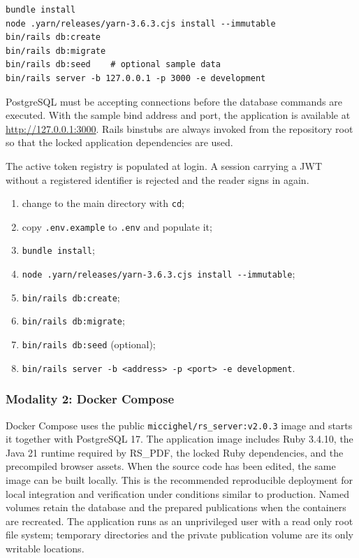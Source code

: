 \documentclass[a4paper, english]{article}
\newcounter{subsubsubsection}[subsubsection]
\newcommand{\rspdf}{RS\_PDF\xspace}
\begin{document}
\begin{lstlisting}
bundle install
node .yarn/releases/yarn-3.6.3.cjs install --immutable
bin/rails db:create
bin/rails db:migrate
bin/rails db:seed    # optional sample data
bin/rails server -b 127.0.0.1 -p 3000 -e development
\end{lstlisting}

PostgreSQL must be accepting connections before the database commands are executed. With the sample bind address and port, the application is available at \url{http://127.0.0.1:3000}. Rails binstubs are always invoked from the repository root so that the locked application dependencies are used.

The active token registry is populated at login. A session carrying a JWT without a registered identifier is rejected and the reader signs in again.


\begin{enumerate}
\item change to the main directory with \verb|cd|;
\item copy \verb|.env.example| to \verb|.env| and populate it;
\item \verb|bundle install|;
\item \verb|node .yarn/releases/yarn-3.6.3.cjs install --immutable|;
\item \verb|bin/rails db:create|;
\item \verb|bin/rails db:migrate|;
\item \verb|bin/rails db:seed| (optional);
\item \verb|bin/rails server -b <address> -p <port> -e development|.
\end{enumerate}

\subsubsection{Modality 2: Docker Compose}

Docker Compose uses the public \verb|miccighel/rs_server:v2.0.3| image and starts it together with PostgreSQL 17. The application image includes Ruby 3.4.10, the Java 21 runtime required by \rspdf, the locked Ruby dependencies, and the precompiled browser assets. When the source code has been edited, the same image can be built locally. This is the recommended reproducible deployment for local integration and verification under conditions similar to production. Named volumes retain the database and the prepared publications when the containers are recreated. The application runs as an unprivileged user with a read only root file system; temporary directories and the private publication volume are its only writable locations.
\end{document}
